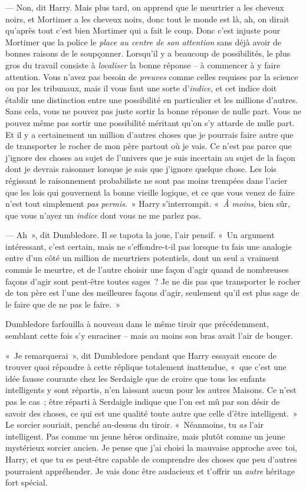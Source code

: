 --- Non, dit Harry.
Mais plus tard, on apprend que le meurtrier a les cheveux noirs, et Mortimer a les cheveux noirs, donc tout le monde est là, ah, on dirait qu'après tout c'est bien Mortimer qui a fait le coup.
Donc c'est injuste pour Mortimer que la police le \emph{place au centre de son attention} sans déjà avoir de bonnes raisons de le soupçonner.
Lorsqu'il y a beaucoup de possibilités, le plus gros du travail consiste à \emph{localiser} la bonne réponse -- à commencer à y faire attention.
Vous n'avez pas besoin de \emph{preuves} comme celles requises par la science ou par les tribunaux, mais il vous faut une sorte d'\emph{indice}, et cet indice doit établir une distinction entre une possibilité en particulier et les millions d'autres.
Sans cela, vous ne pouvez pas juste sortir la bonne réponse de nulle part.
Vous ne pouvez même pas sortir une possibilité méritant qu'on s'y attarde de nulle part.
Et il y a certainement un million d'autres choses que je pourrais faire autre que de transporter le rocher de mon père partout où je vais.
Ce n'est pas parce que j'ignore des choses au sujet de l'univers que je suis incertain au sujet de la façon dont je devrais raisonner lorsque je sais que j'ignore quelque chose.
Les lois régissant le raisonnement probabiliste ne sont pas moins trempées dans l'acier que les lois qui gouvernent la bonne vieille logique, et ce que vous venez de faire n'est tout simplement \emph{pas permis}.~»
Harry s'interrompit.
«~\emph{À moins}, bien sûr, que vous n'ayez un \emph{indice} dont vous ne me parlez pas.

--- Ah~», dit Dumbledore.
Il se tapota la joue, l'air pensif.
«~Un argument intéressant, c'est certain, mais ne s'effondre-t-il pas lorsque tu fais une analogie entre d'un côté un million de meurtriers potentiels, dont un seul a vraiment commis le meurtre, et de l'autre choisir une façon d'agir quand de nombreuses façons d'agir sont peut-être toutes sages~?
Je ne dis pas que transporter le rocher de ton père est l'une des meilleures façons d'agir, seulement qu'il est plus sage de le faire que de ne pas le faire.~»

Dumbledore farfouilla à nouveau dans le même tiroir que précédemment, semblant cette fois s'y enraciner -- mais au moins son bras avait l'air de bouger.

«~Je remarquerai~», dit Dumbledore pendant que Harry essayait encore de trouver quoi répondre à cette réplique totalement inattendue, «~que c'est une idée fausse courante chez les Serdaigle que de croire que tous les enfants intelligents y sont répartis, n'en laissant aucun pour les autres Maisons.
Ce n'est pas le cas~; être réparti à Serdaigle indique que l'on est mû par son désir de savoir des choses, ce qui est une qualité toute autre que celle d'être intelligent.~»
Le sorcier souriait, penché au-dessus du tiroir.
«~Néanmoins, tu \emph{as} l'air intelligent.
Pas comme un jeune héros ordinaire, mais plutôt comme un jeune mystérieux sorcier ancien.
Je pense que j'ai choisi la mauvaise approche avec toi, Harry, et que tu es peut-être capable de comprendre des choses que peu d'autres pourraient appréhender.
Je vais donc être audacieux et t'offrir un \emph{autre} héritage fort spécial.


